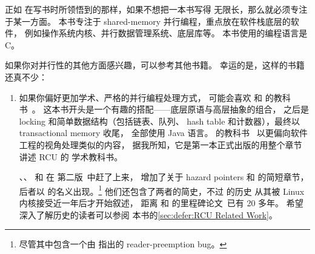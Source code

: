 正如  在写书时所领悟到的那样，如果不想把一本书写得
无限长，那么就必须专注于某一方面。
本书专注于 shared-memory 并行编程，重点放在软件栈底层的软件，
例如操作系统内核、并行数据管理系统、底层库等。
本书使用的编程语言是 C。

如果你对并行性的其他方面感兴趣，可以参考其他书籍。
幸运的是，这样的书籍还真不少：

\begin{enumerate}
\item	如果你偏好更加学术、严格的并行编程处理方式，
	可能会喜欢  和 
	的教科书~\cite{HerlihyShavit2008Textbook,HerlihyShavit2020Textbook}。
	这本书开头是一个有趣的搭配——底层原语与高层抽象的组合，
	之后是 locking 和简单数据结构（包括链表、队列、
	hash table 和计数器），最终以 transactional memory 收尾，
	全部使用 Java 语言。
	 的教科书~\cite{MichaelScott2013Textbook}
	以更偏向软件工程的视角处理类似的内容，
	据我所知，它是第一本正式出版的用整个章节讲述 RCU 的
	学术教科书。

	、、
	 和  在
	第二版~\cite{HerlihyShavit2020Textbook}中赶了上来，
	增加了关于 hazard pointers 和  的简短章节，
	后者以  的名义出现。\footnote{
		尽管其中包含一个由  指出的
		reader-preemption bug。}
	他们还包含了两者的简史，不过  的历史
	从其被 Linux 内核接受近一年后才开始叙述，
	距离  和 
	的里程碑论文~\cite{Kung80}已有 20 多年。
	希望深入了解历史的读者可以参阅
	本书的\cref{sec:defer:RCU Related Work}。


\end{enumerate}
